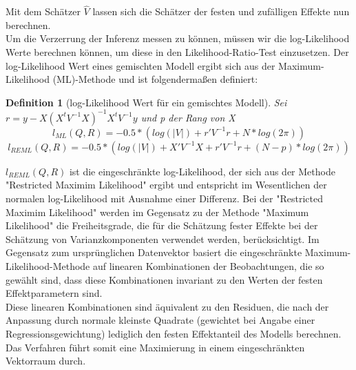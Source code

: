 \documentclass[%
thesis=student,%
coverpage=false,%
titlepage=false,%
headmarks=true, %
german,%
font=libertine, %
math=newpxtx, %
BCOR=5mm,%
coverBCOR=11mm%
]{tumbook}
\theoremstyle{break}
\newtheorem{definition}{Definition}[section]
\begin{document}
Mit dem Schätzer $\hat{V}$ lassen sich die Schätzer der festen und zufälligen Effekte nun berechnen.\\
Um die Verzerrung der Inferenz messen zu können, müssen wir die  log-Likelihood Werte berechnen können, um diese in den Likelihood-Ratio-Test einzusetzen. Der log-Likelihood Wert eines gemischten Modell ergibt sich aus der Maximum-Likelihood (ML)-Methode und ist folgendermaßen definiert:
\begin{definition}[log-Likelihood Wert für ein gemischtes Modell]
	Sei $r = y - X(X^tV^{-1}X)^{-1}X^tV^{-1}y$ und p der Rang von X
	$$ l_{ML}(Q,R) = -0.5 * (log(|V|)+ r'V^{-1}r + N * log(2\pi))$$
	$$l_{REML}(Q,R) = -0.5 * (log(|V|)+ X'V^{-1}X + r'V^{-1}r+ (N-p) * log(2\pi))$$
\end{definition}\noindent
$l_{REML}(Q,R)$ ist die eingeschränkte log-Likelihood, der sich aus der Methode "Restricted Maximim Likelihood" ergibt und entspricht im Wesentlichen der normalen log-Likelihood mit Ausnahme einer Differenz. Bei der "Restricted Maximim Likelihood" werden im Gegensatz zu der Methode "Maximum Likelihood" die Freiheitsgrade, die für die Schätzung fester Effekte bei der Schätzung von Varianzkomponenten verwendet werden, berücksichtigt. Im Gegensatz zum ursprünglichen Datenvektor basiert die eingeschränkte Maximum-Likelihood-Methode auf linearen Kombinationen der Beobachtungen, die so gewählt sind, dass diese Kombinationen invariant zu den Werten der festen Effektparametern sind. \\
Diese linearen Kombinationen sind äquivalent zu den Residuen, die nach der Anpassung durch normale kleinste Quadrate (gewichtet bei Angabe einer Regressionsgewichtung) lediglich den festen Effektanteil des Modells berechnen. Das Verfahren führt somit eine Maximierung in einem eingeschränkten Vektorraum durch.
\end{document}
